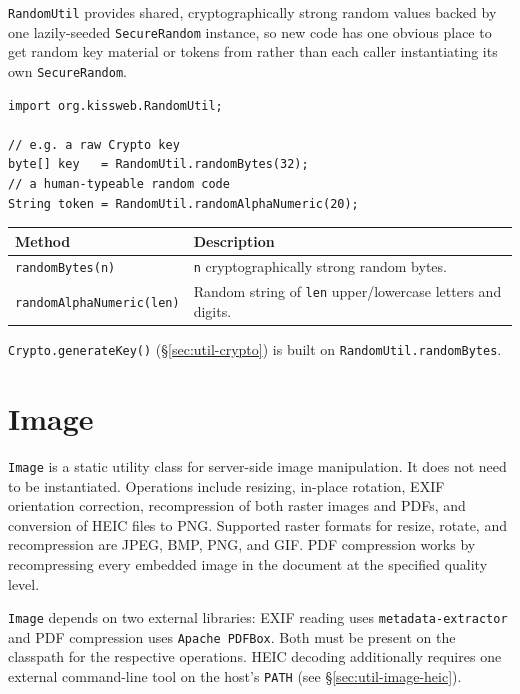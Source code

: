 \texttt{RandomUtil} provides shared, cryptographically strong random values backed by one lazily-seeded \texttt{SecureRandom} instance, so new code has one obvious place to get random key material or tokens from rather than each caller instantiating its own \texttt{SecureRandom}.

\begin{lstlisting}[style=java]
import org.kissweb.RandomUtil;

// e.g. a raw Crypto key
byte[] key   = RandomUtil.randomBytes(32);
// a human-typeable random code
String token = RandomUtil.randomAlphaNumeric(20);
\end{lstlisting}

\begin{longtable}{P{4.8cm}P{5.7cm}}
\toprule
\textbf{Method} & \textbf{Description} \\
\midrule
\endhead
\texttt{randomBytes(n)} & \texttt{n} cryptographically strong random bytes. \\
\texttt{randomAlphaNumeric(len)} & Random string of \texttt{len} upper/lowercase letters and digits. \\
\bottomrule
\end{longtable}

\noindent
\texttt{Crypto.generateKey()} (\S\ref{sec:util-crypto}) is built on \texttt{RandomUtil.randomBytes}.

\section{Image}
\label{sec:util-image}

\texttt{Image} is a static utility class for server-side image manipulation.  It does not need to be instantiated.  Operations include resizing, in-place rotation, EXIF orientation correction, recompression of both raster images and PDFs, and conversion of HEIC files to PNG.  Supported raster formats for resize, rotate, and recompression are JPEG, BMP, PNG, and GIF.  PDF compression works by recompressing every embedded image in the document at the specified quality level.

\begin{notebox}
\texttt{Image} depends on two external libraries: EXIF reading uses \texttt{metadata-extractor} and PDF compression uses \texttt{Apache PDFBox}.  Both must be present on the classpath for the respective operations.  HEIC decoding additionally requires one external command-line tool on the host's \texttt{PATH} (see \S\ref{sec:util-image-heic}).
\end{notebox}

